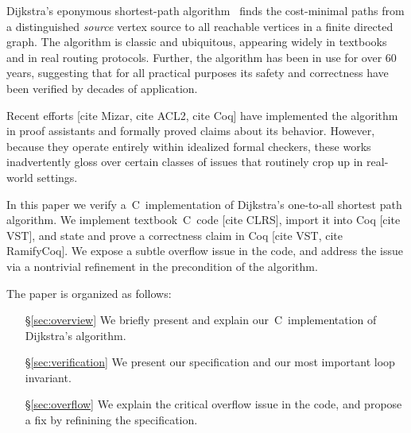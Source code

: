 Dijkstra's eponymous shortest-path algorithm~\cite{DBLP:journals/nm/Dijkstra59} finds
the cost-minimal paths from a distinguished \emph{source} vertex
source to all reachable vertices in a finite directed graph.
The algorithm is classic and ubiquitous, appearing widely in textbooks~\cite{clrs}
and in real routing protocols. Further, the algorithm has been in
use for over $60$ years, suggesting that for all practical purposes
its safety and correctness have been verified by decades of application.

Recent efforts [cite Mizar, cite ACL2, cite Coq] have implemented the algorithm
in proof assistants and formally proved claims about its behavior.
However, because they operate entirely within idealized formal checkers,
these works inadvertently gloss over certain classes of issues
that routinely crop up in real-world settings.

In this paper we verify a~C~implementation of Dijkstra's
one-to-all shortest path algorithm. We implement
textbook~C~code [cite CLRS], import it into Coq [cite VST],
and state and prove a correctness claim in Coq [cite VST, cite RamifyCoq].
We expose a subtle overflow issue in the code, and address the issue
via a nontrivial refinement in the precondition of the algorithm.

The paper is organized as follows:
\vspace{-1em}
\begin{itemize}
    \item[\S\ref{sec:overview}] We briefly present and explain
    our~C~implementation of Dijkstra's algorithm.
    \item[\S\ref{sec:verification}] We present our specification
    and our most important loop invariant.
    \item[\S\ref{sec:overflow}] We explain the critical overflow issue
    in the code, and propose a fix by refinining the specification.
\end{itemize} 